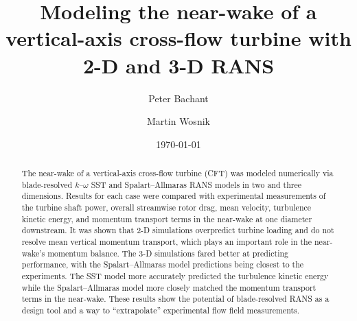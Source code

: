 \documentclass[aip,graphicx]{revtex4-1}
\begin{document}

\title{Modeling the near-wake of a vertical-axis cross-flow turbine with 2-D and
    3-D RANS}



\author{Peter Bachant}

\author{Martin Wosnik}


\date{\today}

\begin{abstract}
    The near-wake of a vertical-axis cross-flow turbine (CFT) was modeled
    numerically via blade-resolved $k$--$\omega$ SST and Spalart--Allmaras RANS
    models in two and three dimensions. Results for each case were compared with
    experimental measurements of the turbine shaft power, overall streamwise
    rotor drag, mean velocity, turbulence kinetic energy, and momentum transport
    terms in the near-wake at one diameter downstream. It was shown that 2-D
    simulations overpredict turbine loading and do not resolve mean vertical
    momentum transport, which plays an important role in the near-wake's
    momentum balance. The 3-D simulations fared better at predicting
    performance, with the Spalart--Allmaras model predictions being closest to
    the experiments. The SST model more accurately predicted the turbulence
    kinetic energy while the Spalart--Allmaras model more closely matched the
    momentum transport terms in the near-wake. These results show the potential
    of blade-resolved RANS as a design tool and a way to ``extrapolate''
    experimental flow field measurements.
\end{abstract}
\end{document}
